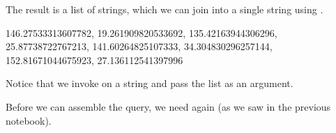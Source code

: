 \documentclass[letterpaper,10pt,english]{sphinxmanual}
\begin{document}
\begin{sphinxVerbatim}[commandchars=\\\{\}]
  

  \PYG{p}{[}
        \PYG{p}{]}
\end{sphinxVerbatim}

\begin{sphinxVerbatim}
\end{sphinxVerbatim}

The result is a list of strings, which we can join into a single string using .

\begin{sphinxVerbatim}[commandchars=\\\{\}]
  
\end{sphinxVerbatim}

\begin{sphinxVerbatim}[commandchars=\\\{\}]
\PYGZsq{}146.27533313607782, 19.261909820533692, 135.42163944306296, 25.87738722767213, 141.60264825107333, 34.304830296257144, 152.81671044675923, 27.136112541397996\PYGZsq{}
\end{sphinxVerbatim}

Notice that we invoke  on a string and pass the list as an argument.

Before we can assemble the query, we need  again (as we saw in the previous notebook).

\begin{sphinxVerbatim}[commandchars=\\\{\}]
  
\end{sphinxVerbatim}
\end{document}
